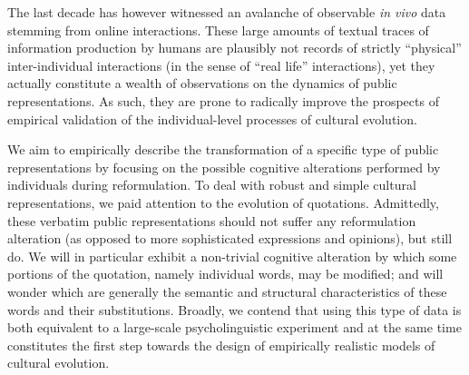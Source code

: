 The last decade has however witnessed an avalanche of observable \emph{in vivo} data stemming from online interactions. These large amounts of textual traces of information production by humans are plausibly not records of strictly ``physical'' inter-individual interactions (in the sense of ``real life'' interactions), yet they actually constitute a wealth of observations on the dynamics of public representations. As such, they are prone to radically improve the prospects of empirical validation of the individual-level processes of cultural evolution. 

We aim to empirically describe the transformation of a specific type of public representations by focusing on the possible cognitive alterations performed by individuals during reformulation.  %
To deal with robust and simple cultural representations, we paid attention to the evolution of quotations. Admittedly, these verbatim public representations should not suffer any reformulation alteration (as opposed to more sophisticated expressions and opinions), but still do.  We will in particular exhibit a non-trivial cognitive alteration by which some portions of the quotation, namely individual words, may be modified; and will wonder which are generally the semantic and structural characteristics of these words and their substitutions. 
Broadly, we contend that using this type of data is both equivalent to a large-scale psycholinguistic experiment and at the same time constitutes the first step towards the design of empirically realistic models of cultural evolution. 

